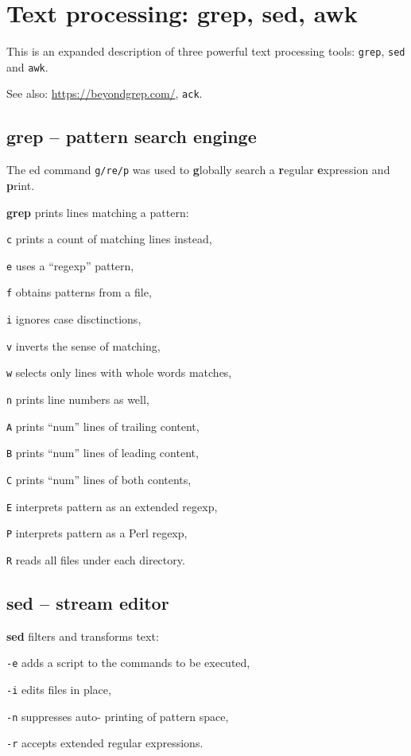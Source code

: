 \section{Text processing: grep, sed, awk}
This is an expanded description of three powerful text processing tools:
\texttt{grep}, \texttt{sed} and \texttt{awk}.

See also: \url{https://beyondgrep.com/}, \texttt{ack}.

\subsection{grep -- pattern search enginge}
The ed command \texttt{g/re/p} was used to \textbf{g}lobally search a \textbf{r}egular \textbf{e}xpression and \textbf{p}rint.
\begin{compactenum}
\item [\cmdvar] \textbf{grep} prints lines matching a pattern:
\item [\texttt{c}] prints a count of matching lines instead,
\item [\texttt{e}] uses a ``regexp'' pattern,
\item [\texttt{f}] obtains patterns from a file,
\item [\texttt{i}] ignores case disctinctions,
\item [\texttt{v}] inverts the sense of matching,
\item [\texttt{w}] selects only lines with whole words matches,
\item [\texttt{n}] prints line numbers as well,
\item [\texttt{A}] prints ``num'' lines of trailing content,
\item [\texttt{B}] prints ``num'' lines of leading content,
\item [\texttt{C}] prints ``num'' lines of both contents,
\item [\texttt{E}] interprets pattern as an extended regexp,
\item [\texttt{P}] interprets pattern as a Perl regexp,
\item [\texttt{R}] reads all files under each directory.
\end{compactenum}

\subsection{sed -- stream editor}
\begin{compactenum}
	\item [\cmdcore] \textbf{sed} filters and transforms text:
	\item [\texttt{-e}] adds a script to the commands to be executed,
	\item [\texttt{-i}] edits files in place,
	\item [\texttt{-n}] suppresses auto- printing of pattern space,
  \item [\texttt{-r}] accepts extended regular expressions.
\end{compactenum}

